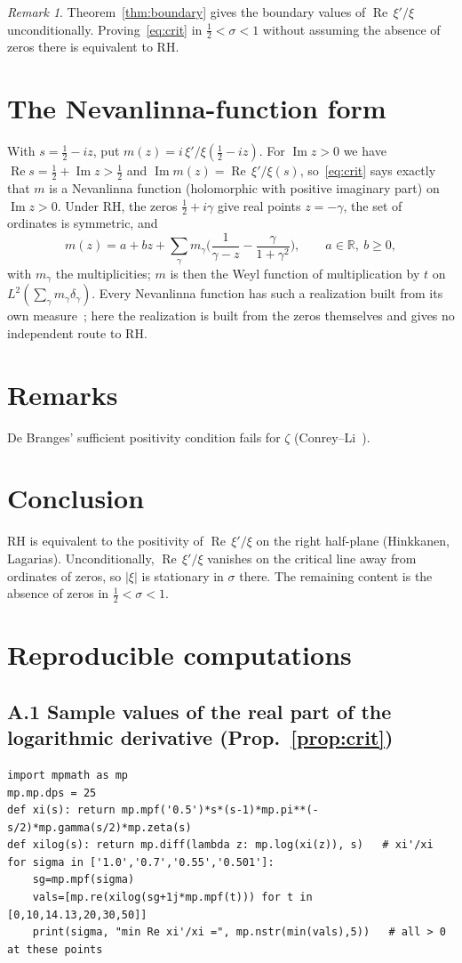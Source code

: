 \documentclass[11pt]{amsart}
\theoremstyle{definition}
\theoremstyle{remark}
\newtheorem{remark}[theorem]{Remark}
\newcommand{\RH}{\mathrm{RH}}
\renewcommand{\Re}{\operatorname{Re}}
\renewcommand{\Im}{\operatorname{Im}}
\newcommand{\half}{\tfrac12}
\begin{document}
\begin{remark}
Theorem~\ref{thm:boundary} gives the boundary values of $\Re\,\xi'/\xi$
unconditionally. Proving~\eqref{eq:crit} in $\half<\sigma<1$ without assuming
the absence of zeros there is equivalent to $\RH$.
\end{remark}

\section{The Nevanlinna-function form}
With $s=\half-iz$, put $m(z)=i\,\xi'/\xi(\half-iz)$. For $\Im z>0$ we have
$\Re s=\half+\Im z>\half$ and $\Im m(z)=\Re\,\xi'/\xi(s)$, so~\eqref{eq:crit} says
exactly that $m$ is a Nevanlinna function (holomorphic with positive imaginary part)
on $\Im z>0$. Under $\RH$, the zeros $\half+i\gamma$ give real points $z=-\gamma$,
the set of ordinates is symmetric, and
\[
m(z)=a+bz+\sum_\gamma m_\gamma\Big(\frac1{\gamma-z}-\frac{\gamma}{1+\gamma^2}\Big),
\qquad a\in\mathbb R,\ b\ge0,
\]
with $m_\gamma$ the multiplicities; $m$ is then the Weyl function of multiplication
by $t$ on $L^2(\sum_\gamma m_\gamma\delta_\gamma)$. Every Nevanlinna function has
such a realization built from its own measure~\cite{deBranges}; here the
realization is built from the zeros themselves and gives no independent route to
$\RH$.

\section{Remarks}
De Branges' sufficient positivity condition fails for $\zeta$
(Conrey--Li~\cite{ConreyLi}).

\section*{Conclusion}
$\RH$ is equivalent to the positivity of $\Re\,\xi'/\xi$ on the right half-plane
(Hinkkanen, Lagarias). Unconditionally, $\Re\,\xi'/\xi$ vanishes on the critical
line away from ordinates of zeros, so $|\xi|$ is stationary in $\sigma$ there. The
remaining content is the absence of zeros in $\half<\sigma<1$.

\appendix
\section{Reproducible computations}\label{app:code}
\subsection*{A.1 Sample values of the real part of the logarithmic derivative (Prop.~\ref{prop:crit})}
\begin{lstlisting}
import mpmath as mp
mp.mp.dps = 25
def xi(s): return mp.mpf('0.5')*s*(s-1)*mp.pi**(-s/2)*mp.gamma(s/2)*mp.zeta(s)
def xilog(s): return mp.diff(lambda z: mp.log(xi(z)), s)   # xi'/xi
for sigma in ['1.0','0.7','0.55','0.501']:
    sg=mp.mpf(sigma)
    vals=[mp.re(xilog(sg+1j*mp.mpf(t))) for t in [0,10,14.13,20,30,50]]
    print(sigma, "min Re xi'/xi =", mp.nstr(min(vals),5))   # all > 0 at these points
\end{lstlisting}
\end{document}
